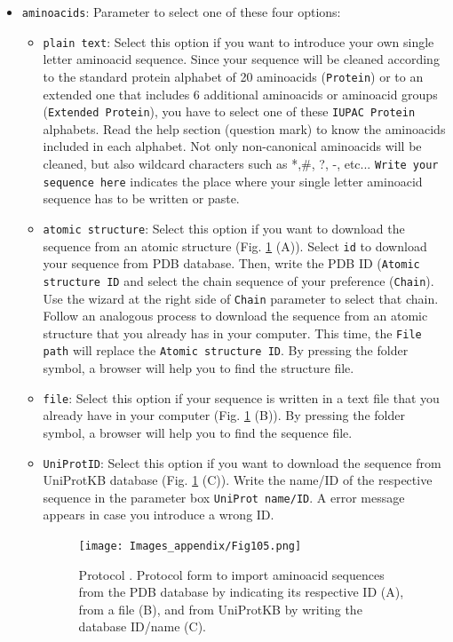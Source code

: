\documentclass[12pt]{article} %
\newcommand{\ffigure}[1]{{Fig. {\ref{#1}}}\xspace}
\newcommand{\scommand}[1]{{{\keys{#1}}}\xspace}
\newcommand{\ttt}[1]{\texttt{#1}}
\begin{document}
\begin{appendices}
\begin{itemize}
\begin{itemize}
  \begin{itemize}
  \item \ttt{aminoacids}: Parameter to select one of these four options:\\
   \begin{itemize}
   \item \ttt{plain text}: Select this option if you want to introduce your own single letter aminoacid sequence. Since your sequence will be cleaned according to the standard protein alphabet of 20 aminoacids (\ttt{Protein}) or to an extended one that includes 6 additional aminoacids or aminoacid groups (\ttt{Extended Protein}), you have to select one of these \ttt{IUPAC Protein} alphabets. Read the help section (question mark) to know the aminoacids included in each alphabet. Not only non-canonical aminoacids will be cleaned, but also wildcard characters such as *,\#, ?, -, etc... \ttt{Write your sequence here} indicates the place where your single letter aminoacid sequence has to be written or paste.\\ 
   \item \ttt{atomic structure}: Select this option if you want to download the sequence from an atomic structure (\ffigure{fig:app_protocol_sequence_2} (A)). Select \ttt{id} to download your sequence from PDB database. Then, write the PDB ID (\ttt{Atomic structure ID} and select the chain sequence of your preference (\ttt{Chain}). Use the wizard at the right side of \ttt{Chain} parameter to select that chain. Follow an analogous process to download the sequence from an atomic structure that you already has in your computer. This time, the \ttt{File path} will replace the \ttt{Atomic structure ID}. By pressing the folder symbol, a browser will help you to find the structure file.\\
   \item \ttt{file}: Select this option if your sequence is written in a text file that you already have in your computer (\ffigure{fig:app_protocol_sequence_2} (B)). By pressing the folder symbol, a browser will help you to find the sequence file.\\
   \item \ttt{UniProtID}: Select this option if you want to download the sequence from UniProtKB database (\ffigure{fig:app_protocol_sequence_2} (C)). Write the name/ID of the respective sequence in the parameter box \ttt{UniProt name/ID}. A error message appears in case you introduce a wrong ID.\\
   
   \begin{figure}[H]
    \centering 
    \captionsetup{width=.7\linewidth} 
    \texttt{[image: Images\_appendix/Fig105.png]}
    \caption{Protocol \scommand{import sequence}. Protocol form to import aminoacid sequences from the PDB database by indicating its respective ID (A), from a file (B), and from UniProtKB by writing the database ID/name (C).}
    \label{fig:app_protocol_sequence_2}
   \end{figure}
   

\end{itemize}
\end{itemize}
\end{itemize}
\end{itemize}
\end{appendices}
\end{document}
